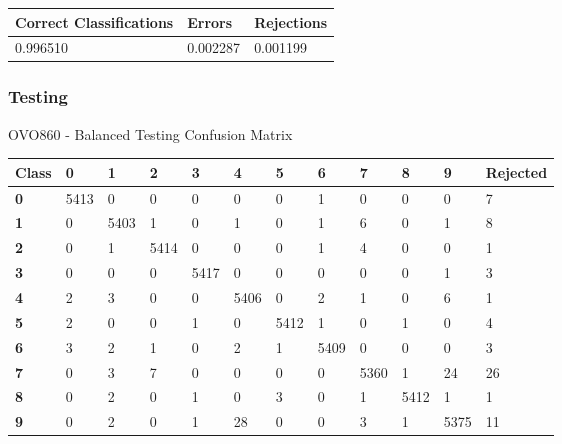 \documentclass[
  a4paper,            %
  DIV=10,             %
  oneside,            %
  BCOR=5mm,           %
  parskip=half,       %
  numbers=noenddot,   %
  bibtotoc,           %
  listof=totoc,        %
  article
]{scrreprt}
\begin{document}
\begin{center}
  \begin{tabular}{|p{5cm}|p{3cm}|p{3cm}|}
    \hline
    \textbf{Correct Classifications} & \textbf{Errors} & \textbf{Rejections} \\
    \hline
    0.996510 & 0.002287 & 0.001199 \\
    \hline
  \end{tabular}
\end{center}
\subsubsection{Testing}
\begin{center}
  \small{OVO860 - Balanced Testing Confusion Matrix}
  \begin{tabular}{|p{1cm}|p{1cm}|p{1cm}|p{1cm}|p{1cm}|p{1cm}|p{1cm}|p{1cm}|p{1cm}|p{1cm}|p{1cm}|p{1.7cm}|}
    \hline
    \textbf{Class} & \textbf{0} & \textbf{1} & \textbf{2} & \textbf{3} & \textbf{4} & \textbf{5} & \textbf{6} & \textbf{7} & \textbf{8} & \textbf{9} & \textbf{Rejected} \\
    \hline
    \textbf{0} & 5413 & 0 & 0 & 0 & 0 & 0 & 1 & 0 & 0 & 0 & 7 \\
    \hline
    \textbf{1} & 0 & 5403 & 1 & 0 & 1 & 0 & 1 & 6 & 0 & 1 & 8 \\
    \hline
    \textbf{2} & 0 & 1 & 5414 & 0 & 0 & 0 & 1 & 4 & 0 & 0 & 1 \\
    \hline
    \textbf{3} & 0 & 0 & 0 & 5417 & 0 & 0 & 0 & 0 & 0 & 1 & 3 \\
    \hline
    \textbf{4} & 2 & 3 & 0 & 0 & 5406 & 0 & 2 & 1 & 0 & 6 & 1 \\
    \hline
    \textbf{5} & 2 & 0 & 0 & 1 & 0 & 5412 & 1 & 0 & 1 & 0 & 4 \\
    \hline
    \textbf{6} & 3 & 2 & 1 & 0 & 2 & 1 & 5409 & 0 & 0 & 0 & 3 \\
    \hline
    \textbf{7} & 0 & 3 & 7 & 0 & 0 & 0 & 0 & 5360 & 1 & 24 & 26 \\
    \hline
    \textbf{8} & 0 & 2 & 0 & 1 & 0 & 3 & 0 & 1 & 5412 & 1 & 1 \\
    \hline
    \textbf{9} & 0 & 2 & 0 & 1 & 28 & 0 & 0 & 3 & 1 & 5375 & 11 \\
    \hline
  \end{tabular}
\end{center}
\end{document}
